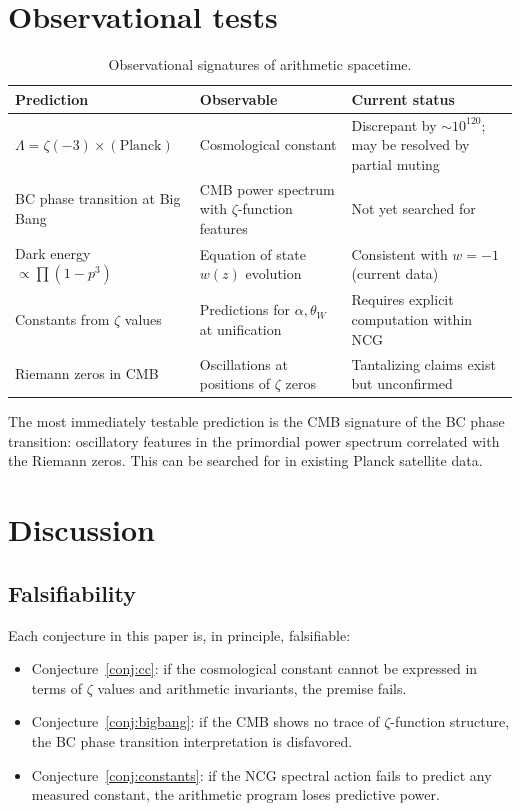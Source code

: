 \documentclass[11pt,a4paper]{article}
\begin{document}
\section{Observational tests}
\label{sec:tests}

\begin{table}[h]
\centering
\caption{Observational signatures of arithmetic spacetime.}
\label{tab:tests}
\small
\begin{tabular}{@{}p{3cm}p{4cm}p{4.5cm}@{}}
\toprule
Prediction & Observable & Current status \\
\midrule
$\Lambda = \zeta(-3) \times (\text{Planck})$ & Cosmological constant
  & Discrepant by $\sim 10^{120}$; may be resolved by partial muting \\
BC phase transition at Big Bang & CMB power spectrum with
  $\zeta$-function features & Not yet searched for \\
Dark energy $\propto \prod (1-p^3)$ & Equation of state $w(z)$
  evolution & Consistent with $w = -1$ (current data) \\
Constants from $\zeta$ values & Predictions for $\alpha, \theta_W$
  at unification & Requires explicit computation within NCG \\
Riemann zeros in CMB & Oscillations at positions of $\zeta$ zeros
  & Tantalizing claims exist~\cite{Wolf2010} but unconfirmed \\
\bottomrule
\end{tabular}
\end{table}

The most immediately testable prediction is the CMB signature
of the BC phase transition: oscillatory features in the
primordial power spectrum correlated with the Riemann zeros.
This can be searched for in existing Planck satellite data.

\section{Discussion}
\label{sec:discussion}

\subsection{Falsifiability}

Each conjecture in this paper is, in principle, falsifiable:
\begin{itemize}
\item Conjecture~\ref{conj:cc}: if the cosmological constant
  cannot be expressed in terms of $\zeta$ values and
  arithmetic invariants, the premise fails.
\item Conjecture~\ref{conj:bigbang}: if the CMB shows no
  trace of $\zeta$-function structure, the BC phase
  transition interpretation is disfavored.
\item Conjecture~\ref{conj:constants}: if the NCG spectral
  action fails to predict any measured constant, the
  arithmetic program loses predictive power.
\end{itemize}
\end{document}

